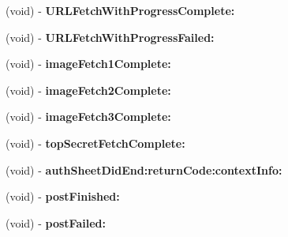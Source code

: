 \begin{DoxyCompactItemize}
\item 
\hypertarget{interface_app_delegate_07_08_a30f0114b3d2c53b319aa52c0676e5170}{
(void) -\/ {\bfseries \-U\-R\-L\-Fetch\-With\-Progress\-Complete\-:}}
\label{interface_app_delegate_07_08_a30f0114b3d2c53b319aa52c0676e5170}

\item 
\hypertarget{interface_app_delegate_07_08_a514b2702b9a9d464e7d3fea052f03aca}{
(void) -\/ {\bfseries \-U\-R\-L\-Fetch\-With\-Progress\-Failed\-:}}
\label{interface_app_delegate_07_08_a514b2702b9a9d464e7d3fea052f03aca}

\item 
\hypertarget{interface_app_delegate_07_08_ade930c52b5535a29172d51bfa21a5992}{
(void) -\/ {\bfseries image\-Fetch1\-Complete\-:}}
\label{interface_app_delegate_07_08_ade930c52b5535a29172d51bfa21a5992}

\item 
\hypertarget{interface_app_delegate_07_08_ad3faea8b1ccf1678112b692681b0a0f4}{
(void) -\/ {\bfseries image\-Fetch2\-Complete\-:}}
\label{interface_app_delegate_07_08_ad3faea8b1ccf1678112b692681b0a0f4}

\item 
\hypertarget{interface_app_delegate_07_08_a529d0776c3f0a9fc82d1b914e134574e}{
(void) -\/ {\bfseries image\-Fetch3\-Complete\-:}}
\label{interface_app_delegate_07_08_a529d0776c3f0a9fc82d1b914e134574e}

\item 
\hypertarget{interface_app_delegate_07_08_a5aabd9eddc120b2b0596ad9e16a6e550}{
(void) -\/ {\bfseries top\-Secret\-Fetch\-Complete\-:}}
\label{interface_app_delegate_07_08_a5aabd9eddc120b2b0596ad9e16a6e550}

\item 
\hypertarget{interface_app_delegate_07_08_a4105cf0e53153c648732d346a3d36a4f}{
(void) -\/ {\bfseries auth\-Sheet\-Did\-End\-:return\-Code\-:context\-Info\-:}}
\label{interface_app_delegate_07_08_a4105cf0e53153c648732d346a3d36a4f}

\item 
\hypertarget{interface_app_delegate_07_08_ac85d1ef9bdb254c0fe788fe536d6d5fe}{
(void) -\/ {\bfseries post\-Finished\-:}}
\label{interface_app_delegate_07_08_ac85d1ef9bdb254c0fe788fe536d6d5fe}

\item 
\hypertarget{interface_app_delegate_07_08_a75c2c2f337b6b7c499fd504bedc6cab8}{
(void) -\/ {\bfseries post\-Failed\-:}}
\label{interface_app_delegate_07_08_a75c2c2f337b6b7c499fd504bedc6cab8}


\end{DoxyCompactItemize}
